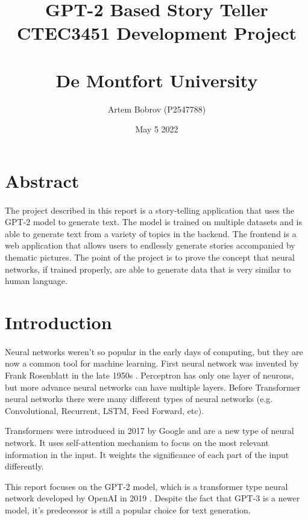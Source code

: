 \documentclass[12pt]{report}
\title{%
  GPT-2 Based Story Teller\\
  \large CTEC3451 Development Project \\~\\
    De Montfort University
  \blfootnote{Word count: 7998}
}
\author{Artem Bobrov (P2547788)}
\date{May 5 2022}
\begin{document}
\maketitle
\thispagestyle{empty}
\clearpage
\section*{Abstract}
\paragraph{}
The project described in this report is a story-telling application that uses the GPT-2 model to generate text. 
The model is trained on multiple datasets and is able to generate text from a variety of topics in the backend. 
The frontend is a web application that allows users to endlessly generate stories accompanied by thematic pictures.
The point of the project is to prove the concept that neural networks, if trained properly, are able to generate 
data that is very similar to human language.
\tableofcontents
\setcounter{tocdepth}{1}
\thispagestyle{empty}
\clearpage

\section*{Introduction}
\paragraph{}
Neural networks weren't so popular in the early days of computing, but they are now a common tool for machine learning.
First neural network was invented by Frank Rosenblatt in the late 1950s \citep{rosenblatt_1958_the}. Perceptron has only 
one layer of neurons, but more advance neural networks can have multiple layers. Before Transformer neural networks 
there were many different types of neural networks (e.g. Convolutional, Recurrent, LSTM, Feed Forward, etc).

Transformers were introduced in 2017 by Google \citep{attention_is_all_you_need} and are a new type of neural network. It uses self-attention mechanism 
to focus on the most relevant information in the input. It weights the significance of each part of the input differently.

This report focuses on the GPT-2 model, which is a transformer type neural network developed by OpenAI in 2019 \citep{radford_wu_child_luan_amodei_sutskever_2019}.
Despite the fact that GPT-3 is a newer model, it's predecessor is still a popular choice for text generation.
\end{document}
